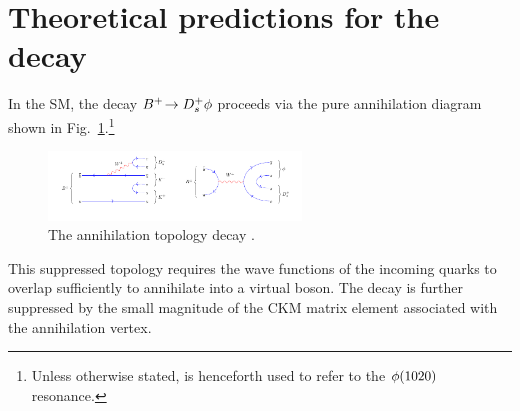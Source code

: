 
\section{Theoretical predictions for the \decay{\Bp}{\Dsp\phiz} decay}
\label{sec:theory_B2DsPhi}

In the SM, the decay ${{{B}^+}}\!\rightarrow {\ensuremath{{D}^+_{s}}}\phi$ proceeds via the pure annihilation diagram shown in Fig.~\ref{fig:Theory_DsPhiDiagram}.\footnote{Unless otherwise stated, \phiz is henceforth used to refer to the $\phi(1020)$ resonance.}  
\begin{figure}[!h]
    \centering
    \includegraphics[width=0.6\textwidth]{figs/Theory/B2DsPhi.pdf}
    \caption{The annihilation topology decay \decay{\Bp}{\Dsp\phiz}. }
    \label{fig:Theory_DsPhiDiagram}   
\end{figure}
This suppressed topology requires the wave functions of the incoming quarks to overlap sufficiently to annihilate into a virtual \Wp boson. The decay is further suppressed by the small magnitude of the CKM matrix element \Vub associated with the annihilation vertex. 

